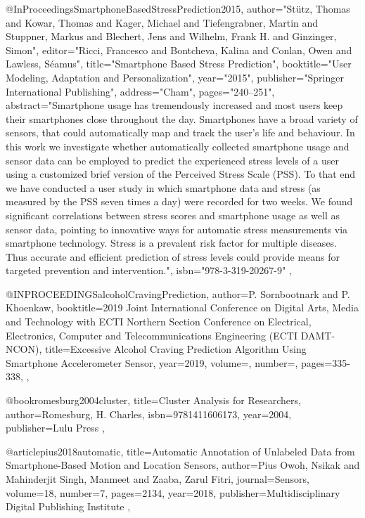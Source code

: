 @InProceedings{SmartphoneBasedStressPrediction2015,
  author="St{\"u}tz, Thomas
  and Kowar, Thomas
  and Kager, Michael
  and Tiefengrabner, Martin
  and Stuppner, Markus
  and Blechert, Jens
  and Wilhelm, Frank H.
  and Ginzinger, Simon",
  editor="Ricci, Francesco
  and Bontcheva, Kalina
  and Conlan, Owen
  and Lawless, S{\'e}amus",
  title="Smartphone Based Stress Prediction",
  booktitle="User Modeling, Adaptation and Personalization",
  year="2015",
  publisher="Springer International Publishing",
  address="Cham",
  pages="240--251",
  abstract="Smartphone usage has tremendously increased and most users keep their smartphones close throughout the day. Smartphones have a broad variety of sensors, that could automatically map and track the user's life and behaviour. In this work we investigate whether automatically collected smartphone usage and sensor data can be employed to predict the experienced stress levels of a user using a customized brief version of the Perceived Stress Scale (PSS). To that end we have conducted a user study in which smartphone data and stress (as measured by the PSS seven times a day) were recorded for two weeks. We found significant correlations between stress scores and smartphone usage as well as sensor data, pointing to innovative ways for automatic stress measurements via smartphone technology. Stress is a prevalent risk factor for multiple diseases. Thus accurate and efficient prediction of stress levels could provide means for targeted prevention and intervention.",
  isbn="978-3-319-20267-9"
},

@INPROCEEDINGS{alcoholCravingPrediction,  
  author={P. {Sornbootnark} and P. {Khoenkaw}},  
  booktitle={2019 Joint International Conference on Digital Arts, Media and Technology with ECTI Northern Section Conference on Electrical, Electronics, Computer and Telecommunications Engineering (ECTI DAMT-NCON)},  
  title={Excessive Alcohol Craving Prediction Algorithm Using Smartphone Accelerometer Sensor},   
  year={2019},  
  volume={},  
  number={},  
  pages={335-338},
},

@book{romesburg2004cluster,
  title={Cluster Analysis for Researchers},
  author={Romesburg, H. Charles},
  isbn={9781411606173},
  year={2004},
  publisher={Lulu Press}
},

@article{pius2018automatic,
  title={Automatic Annotation of Unlabeled Data from Smartphone-Based Motion and Location Sensors},
  author={Pius Owoh, Nsikak and Mahinderjit Singh, Manmeet and Zaaba, Zarul Fitri},
  journal={Sensors},
  volume={18},
  number={7},
  pages={2134},
  year={2018},
  publisher={Multidisciplinary Digital Publishing Institute}
},



